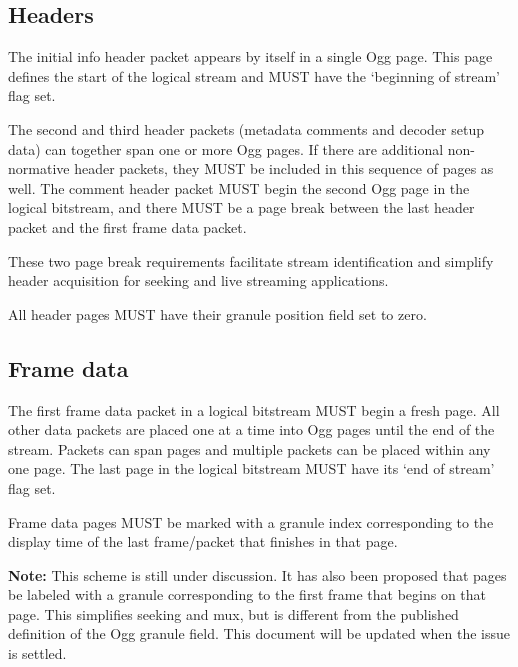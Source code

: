 \documentclass[11pt,letterpaper]{book}
\numberwithin{equation}{chapter}
\numberwithin{figure}{chapter}
\numberwithin{table}{chapter}
\begin{document}
\subsection{Headers}

The initial info header packet appears by itself in a single Ogg page.
This page defines the start of the logical stream and MUST have
 the `beginning of stream' flag set.

The second and third header packets (metadata comments and decoder
 setup data) can together span one or more Ogg pages.
If there are additional non-normative header packets, they MUST be
 included in this sequence of pages as well.
The comment header packet MUST begin the second Ogg page in the logical
 bitstream, and there MUST be a page break between the last header
 packet and the first frame data packet.

These two page break requirements facilitate stream identification and
 simplify header acquisition for seeking and live streaming applications.

All header pages MUST have their granule position field set to zero.

\subsection{Frame data}

The first frame data packet in a logical bitstream MUST begin a fresh page.
All other data packets are placed one at a time into Ogg pages
 until the end of the stream.
Packets can span pages and multiple packets can be placed within any
 one page.
The last page in the logical bitstream MUST have its `end of stream'
 flag set.

Frame data pages MUST be marked with a granule index corresponding to
 the display time of the last frame/packet that finishes in that page.

{\bf Note:}
This scheme is still under discussion.
It has also been proposed that pages be labeled with a granule corresponding to
 the first frame that begins on that page.
This simplifies seeking and mux, but is different from the published
 definition of the Ogg granule field.
This document will be updated when the issue is settled.

\end{document}
